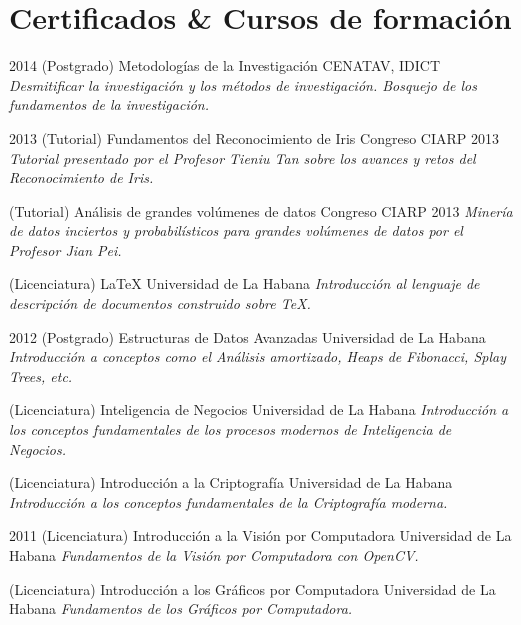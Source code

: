 \documentclass[]{friggeri-cv}
\begin{document}
\section{Certificados \& Cursos de formación}
\begin{entrylist}
  \entry
    {2014}
    {(Postgrado) Metodologías de la Investigación}
    {CENATAV, IDICT}
    {\emph{Desmitificar la investigación y los métodos de investigación. Bosquejo de los fundamentos de la investigación.}}
\end{entrylist}

\begin{entrylist}    
  \entry
    {2013}
    {(Tutorial) Fundamentos del Reconocimiento de Iris}
    {Congreso CIARP 2013}
    {\emph{Tutorial presentado por el Profesor Tieniu Tan sobre los avances y retos del Reconocimiento de Iris.}}

  \entry
    {}
    {(Tutorial) Análisis de grandes volúmenes de datos}
    {Congreso CIARP 2013}
    {\emph{Minería de datos inciertos y probabilísticos para grandes volúmenes de datos por el Profesor Jian Pei.}}
    
  \entry
    {}
    {(Licenciatura) \LaTeX}
    {Universidad de La Habana}
    {\emph{Introducción al lenguaje de descripción de documentos construido sobre \TeX.}}
\end{entrylist}
       
\begin{entrylist}
  \entry
    {2012}
    {(Postgrado) Estructuras de Datos Avanzadas}
    {Universidad de La Habana}
    {\emph{Introducción a conceptos como el Análisis amortizado, Heaps de Fibonacci, Splay Trees, etc.}}      

  \entry
    {}
    {(Licenciatura) Inteligencia de Negocios}
    {Universidad de La Habana}
    {\emph{Introducción a los conceptos fundamentales de los procesos modernos de Inteligencia de Negocios.}}

  \entry
    {}
    {(Licenciatura) Introducción a la Criptografía}
    {Universidad de La Habana}
    {\emph{Introducción a los conceptos fundamentales de la Criptografía moderna.}}
\end{entrylist}

\begin{entrylist}
  \entry
    {2011}
    {(Licenciatura) Introducción a la Visión por Computadora}
    {Universidad de La Habana}
    {\emph{Fundamentos de la Visión por Computadora con OpenCV.}}      

  \entry
    {}
    {(Licenciatura) Introducción a los Gráficos por Computadora}
    {Universidad de La Habana}
    {\emph{Fundamentos de los Gráficos por Computadora.}}
\end{entrylist}
\end{document}
